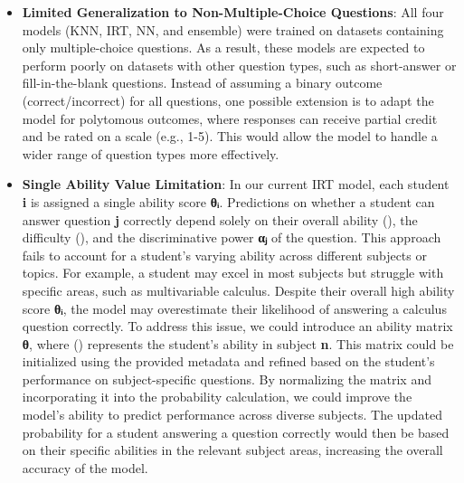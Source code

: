 \documentclass{article}
\begin{document}
\begin{itemize}
\item \textbf{Limited Generalization to Non-Multiple-Choice Questions}: All four models (KNN, IRT, NN, and ensemble) were trained on datasets containing only multiple-choice questions. As a result, these models are expected to perform poorly on datasets with other question types, such as short-answer or fill-in-the-blank questions. Instead of assuming a binary outcome (correct/incorrect) for all questions, one possible extension is to adapt the model for polytomous outcomes, where responses can receive partial credit and be rated on a scale (e.g., 1-5). This would allow the model to handle a wider range of question types more effectively.
\item \textbf{Single Ability Value Limitation}: In our current IRT model, each student \textbf{i} is assigned a single ability score \textbf{θᵢ}. Predictions on whether a student can answer question \textbf{j} correctly depend solely on their overall ability (), the difficulty (), and the discriminative power \textbf{αⱼ} of the question. This approach fails to account for a student's varying ability across different subjects or topics. For example, a student may excel in most subjects but struggle with specific areas, such as multivariable calculus. Despite their overall high ability score \textbf{θᵢ}, the model may overestimate their likelihood of answering a calculus question correctly. To address this issue, we could introduce an ability matrix \textbf{θ}, where () represents the student's ability in subject \textbf{n}. This matrix could be initialized using the provided metadata and refined based on the student's performance on subject-specific questions. By normalizing the matrix and incorporating it into the probability calculation, we could improve the model's ability to predict performance across diverse subjects. The updated probability for a student answering a question correctly would then be based on their specific abilities in the relevant subject areas, increasing the overall accuracy of the model.
\end{itemize}
\end{document}
